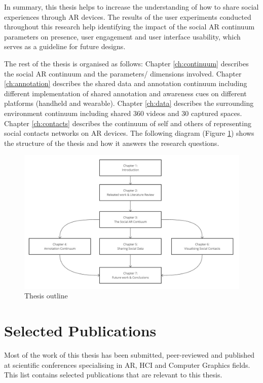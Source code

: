 In summary, this thesis helps to increase the understanding of how to share social experiences through AR devices. The results of the user experiments conducted throughout this research help identifying the impact of the social AR continuum parameters on presence, user engagement and user interface usability, which serves as a guideline for future designs. 

The rest of the thesis is organised as follows: Chapter \ref{ch:continuum} describes the social AR continuum and the parameters/ dimensions involved. Chapter \ref{ch:annotation} describes the shared data and annotation continuum including different implementation of shared annotation and awareness cues on different platforms (handheld and wearable). Chapter \ref{ch:data} describes the surrounding environment continuum including shared 360 videos and 30 captured spaces. Chapter \ref{ch:contacts} describes the continuum of self and others of representing social contacts networks on AR devices. The following diagram (Figure \ref{fig:thesis-outline}) shows the structure of the thesis and how it answers the research questions. 

\begin{figure}
    \centering
    \includegraphics[width=.8\linewidth]{images/thesis-outline.png}
    \caption{Thesis outline}
    \label{fig:thesis-outline}
\end{figure}

\section{Selected Publications}

Most of the work of this thesis has been submitted, peer-reviewed and published at scientific conferences specialising in AR, HCI and Computer Graphics fields. This list contains selected publications that are relevant to this thesis. 

